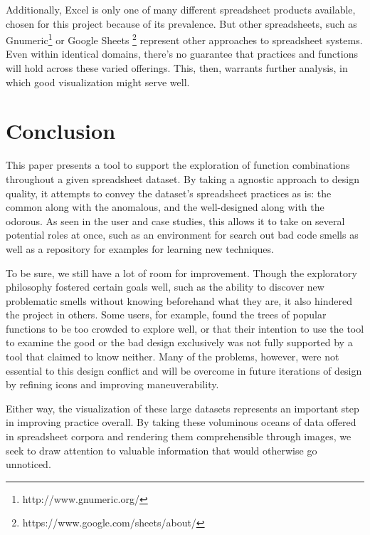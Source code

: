 \documentclass[conference]{IEEEtran}
\begin{document}
	Additionally, Excel is only one of many different spreadsheet products available, 
	chosen for this project because of its prevalence. But other spreadsheets, such as
	Gnumeric\footnote{http://www.gnumeric.org/} or Google Sheets \footnote{https://www.google.com/sheets/about/}
	represent other approaches to spreadsheet systems. Even within identical domains,
	there's no guarantee that practices and functions will hold across these varied
	offerings. This, then, warrants further analysis, in which good visualization might
	serve well. \par 
	
	\section{Conclusion} 
	This paper presents a tool to support the exploration of function combinations
	throughout a given spreadsheet dataset. By taking a agnostic approach to design
	quality, it attempts to convey the dataset's spreadsheet practices as is: the
	common along with the anomalous, and the well-designed along with the odorous.
	As seen in the user and case studies, this allows it to take on several potential
	roles at once, such as an environment for search out bad code smells as well as
	a repository for examples for learning new techniques. \par 
	
	To be sure, we still have a lot of room for improvement. Though the exploratory
	philosophy fostered certain goals well, such as the ability to discover new
	problematic smells without knowing beforehand what they are, it also hindered
	the project in others. Some users, for example, found the trees of popular 
	functions to be too crowded to explore well, or that their intention to use
	the tool to examine the good or the bad design exclusively was not fully
	supported by a tool that claimed to know neither. Many of the problems, however,
	were not essential to this design conflict and will be overcome in future
	iterations of design by refining icons and improving maneuverability. \par 
	
	Either way, the visualization of these large datasets represents an important
	step in improving practice overall. By taking these voluminous oceans of data
	offered in spreadsheet corpora and rendering them comprehensible through
	images, we seek to draw attention to valuable information that would otherwise
	go unnoticed. 
	
\end{document}
